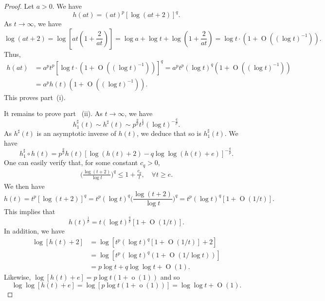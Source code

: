 \documentclass[10pt, a4paper]{amsart}
\newcommand{\op}{\operatorname}
\numberwithin{equation}{section}
\theoremstyle{definition}
\theoremstyle{remark}
\begin{document}
\begin{proof}
Let $a>0$. We have
\begin{equation*}
h(at)=(at)^p[\log (at+2)]^q.
\end{equation*}
As $t\to\infty$, we have
\begin{equation*}
\log(at+2)=\log[at(1+\frac2{at})]=\log a+\log t+\log(1+\frac2{at})=\log t\cdot(1+\op{O}((\log t)^{-1})).
\end{equation*}
Thus,
\begin{align*}
h(at)&=a^pt^p[\log t\cdot(1+\op{O}((\log t)^{-1}))]^q=a^pt^p(\log t)^q (1+\op{O}((\log t)^{-1}))\\
&=a^ph(t)(1+\op{O}((\log t)^{-1})).
\end{align*}
This proves part~(i).

It remains to prove part ~(ii). As $t\to\infty$, we have
\begin{equation*}
h^\sharp_1(t)\sim h^\sharp(t)\sim p^{\frac{q}{p}} t^{\frac1p}(\log t)^{-\frac{q}{p}}.
\end{equation*}
As $h^\sharp(t)$ is an asymptotic inverse of $h(t)$, we deduce that so is $h_1^\sharp(t)$. We have
\begin{equation}\label{eq:computation of h_1sharp}
h_1^\sharp\circ h(t)=p^{\frac{q}{p}}h(t) \left[\log(h(t)+2) - q\log \log (h(t)+e)\right]^{-\frac{q}{p}}.
\end{equation}
One can easily verify that, for some constant $c_q>0$,
\begin{align*}
\Big(\frac{\log(t+2)}{\log t}\Big)^q\leq 1+\frac{c_q}{t},\quad \forall t\geq e.
\end{align*}
We then have
\begin{equation*}
h(t)=t^p[\log(t+2)]^q=t^p(\log t)^q\Big(\frac{\log(t+2)}{\log t}\Big)^q=t^p(\log t)^q[1+\op{O}(1/t)].
\end{equation*}
This implies that
\begin{equation}\label{eq:1/p power}
h(t)^{\frac1p}=t(\log t)^{\frac{q}{p}}[1+\op{O}(1/t)].
\end{equation}
In addition, we have
\begin{align*}
\log[h(t)+2]&=\log[t^p(\log t)^q[1+\op{O}(1/t)]+2]\\
&=\log[t^p(\log t)^q(1+\op{O}(1/{\log t}))]\\
&=p\log t+q\log\log t+\op{O}(1).
\end{align*}
Likewise, $\log[h(t)+e]=p\log t(1+\op{o}(1))$ and so
\begin{equation*}
\log\log[h(t)+e]=\log[p\log t(1+\op{o}(1))]=\log\log t+\op{O}(1).

\end{equation*}
\end{proof}
\end{document}

